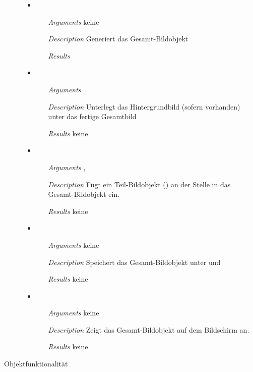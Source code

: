 \begin{description}
\begin{itemize}
\item {}
\begin{enumerate}
\item[\textit{Arguments}] keine
\item[\textit{Description}] Generiert das Gesamt-Bildobjekt
\item[\textit{Results}] 
\end{enumerate}

\item {}
\begin{enumerate}
\item[\textit{Arguments}] 
\item[\textit{Description}] Unterlegt das Hintergrundbild (sofern
  vorhanden) unter das fertige Gesamtbild
\item[\textit{Results}] keine
\end{enumerate}

\item {}
\begin{enumerate}
\item[\textit{Arguments}] , 
\item[\textit{Description}] F\"ugt ein Teil-Bildobjekt
  () an der Stelle  in das
  Gesamt-Bildobjekt ein.
\item[\textit{Results}] keine
\end{enumerate}

\item {}
\begin{enumerate}
\item[\textit{Arguments}] keine
\item[\textit{Description}] Speichert das Gesamt-Bildobjekt unter
   und 
\item[\textit{Results}] keine
\end{enumerate}

\item {}
\begin{enumerate}
\item[\textit{Arguments}] keine
\item[\textit{Description}] Zeigt das Gesamt-Bildobjekt auf dem
  Bildschirm an.
\item[\textit{Results}] keine
\end{enumerate}

\end{itemize}


\newpage

\item[Objektfunktionalit\"at]
\end{description}

